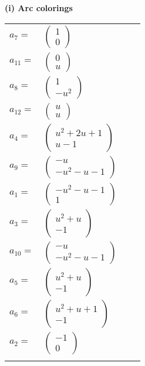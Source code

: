 \documentclass[1p]{elsarticle_modified}
\theoremstyle{definition}
\begin{document}
\flushleft \textbf{(i) Arc colorings}\\
\begin{tabular}{m{7pt} m{180pt} m{7pt} m{180pt} }
\flushright $a_{7}=$&$\begin{pmatrix}1\\0\end{pmatrix}$ \\
\flushright $a_{11}=$&$\begin{pmatrix}0\\u\end{pmatrix}$ \\
\flushright $a_{8}=$&$\begin{pmatrix}1\\- u^2\end{pmatrix}$ \\
\flushright $a_{12}=$&$\begin{pmatrix}u\\u\end{pmatrix}$ \\
\flushright $a_{4}=$&$\begin{pmatrix}u^2+2 u+1\\u-1\end{pmatrix}$ \\
\flushright $a_{9}=$&$\begin{pmatrix}- u\\- u^2- u-1\end{pmatrix}$ \\
\flushright $a_{1}=$&$\begin{pmatrix}- u^2- u-1\\1\end{pmatrix}$ \\
\flushright $a_{3}=$&$\begin{pmatrix}u^2+u\\-1\end{pmatrix}$ \\
\flushright $a_{10}=$&$\begin{pmatrix}- u\\- u^2- u-1\end{pmatrix}$ \\
\flushright $a_{5}=$&$\begin{pmatrix}u^2+u\\-1\end{pmatrix}$ \\
\flushright $a_{6}=$&$\begin{pmatrix}u^2+u+1\\-1\end{pmatrix}$ \\
\flushright $a_{2}=$&$\begin{pmatrix}-1\\0\end{pmatrix}$\\&\end{tabular}
\end{document}
